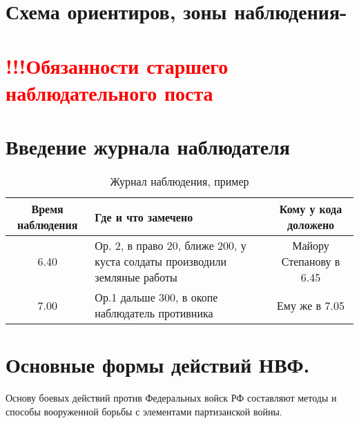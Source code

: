 \documentclass[12pt,a4paper]{report}
\begin{document}
\section{Схема ориентиров, зоны наблюдения-}

\section{\textcolor{red}{!!!Обязанности старшего наблюдательного поста}}
\newpage 

\section{Введение журнала наблюдателя}

\begin{table}[h!]
	\caption{Журнал наблюдения, пример}
	\begin{center}
		\begin{tabular}{|c| p{8cm} |c|}
			\hline 
			Время наблюдения & Где и что замечено & Кому у кода доложено\\
			\hline
			6.40 & Ор. 2, в право 20, ближе 200, у куста солдаты производили земляные работы & Майору Степанову в 6.45\\
			7.00 & Ор.1 дальше 300, в окопе наблюдатель противника & Ему же в 7.05 \\
			\hline
		\end{tabular}
	\end{center}
\end{table}

\section{Основные формы действий НВФ.}
Основу боевых действий против Федеральных войск РФ составляют методы и способы вооруженной борьбы с элементами партизанской войны. 
\end{document}
